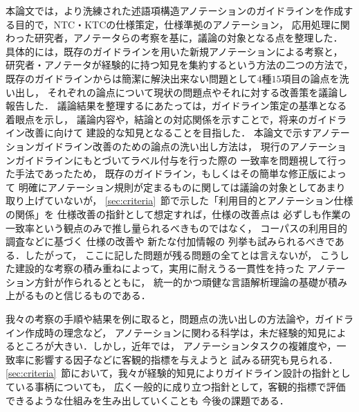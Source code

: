 \documentclass[japanese]{jnlp_1.4}
\begin{document}
本論文では，より洗練された述語項構造アノテーションのガイドラインを作成する目的で，NTC・KTCの仕様策定，仕様準拠のアノテーション，
応用処理に関わった研究者，アノテータらの考察を基に，議論の対象となる点を整理した．
具体的には，既存のガイドラインを用いた新規アノテーションによる考察と，
研究者・アノテータが経験的に持つ知見を集約するという方法の二つの方法で，
既存のガイドラインからは簡潔に解決出来ない問題として$4$種$15$項目の論点を洗い出し，
それぞれの論点について現状の問題点やそれに対する改善策を議論し報告した．
議論結果を整理するにあたっては，ガイドライン策定の基準となる着眼点を示し，
議論内容や，結論との対応関係を示すことで，将来のガイドライン改善に向けて
建設的な知見となることを目指した．
本論文で示すアノテーションガイドライン改善のための論点の洗い出し方法は，
現行のアノテーションガイドラインにもとづいてラベル付与を行った際の
一致率を問題視して行った手法であったため，
既存のガイドライン，もしくはその簡単な修正版によって
明確にアノテーション規則が定まるものに関しては議論の対象としてあまり取り上げていないが，
\ref{sec:criteria}~節で示した「利用目的とアノテーション仕様の関係」を
仕様改善の指針として想定すれば，仕様の改善点は
必ずしも作業の一致率という観点のみで推し量られるべきものではなく，
コーパスの利用目的調査などに基づく
仕様の改善や
新たな付加情報の
列挙も試みられるべきである．したがって，
ここに記した問題が残る問題の全てとは言えないが，
こうした建設的な考察の積み重ねによって，実用に耐えうる一貫性を持った
アノテーション方針が作られるとともに，
統一的かつ頑健な言語解析理論の基礎が積み上がるものと信じるものである．


我々の考察の手順や結果を例に取ると，問題点の洗い出しの方法論や，ガイドライン作成時の理念など，
アノテーションに関わる科学は，未だ経験的知見によるところが大きい．しかし，近年では，
アノテーションタスクの複雑度や，一致率に影響する因子などに客観的指標を与えようと
試みる研究も見られる\cite{Bayerl:2011:DIA:2077692.2077696,fort2012modeling}．
\ref{sec:criteria}~節において，我々が経験的知見によりガイドライン設計の指針としている事柄についても，
広く一般的に成り立つ指針として，客観的指標で評価できるような仕組みを生み出していくことも
今後の課題である．
\end{document}
